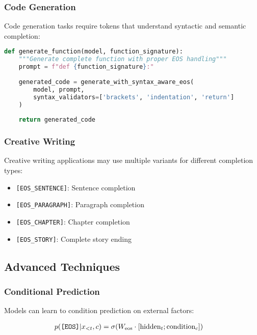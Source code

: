 \subsubsection{Code Generation}

Code generation tasks require \eos{} tokens that understand syntactic and semantic completion:

\begin{lstlisting}[language=Python, caption=Code generation with syntactic \eos{}]
def generate_function(model, function_signature):
    """Generate complete function with proper EOS handling"""
    prompt = f"def {function_signature}:"
    
    generated_code = generate_with_syntax_aware_eos(
        model, prompt, 
        syntax_validators=['brackets', 'indentation', 'return']
    )
    
    return generated_code
\end{lstlisting}

\subsubsection{Creative Writing}

Creative writing applications may use multiple \eos{} variants for different completion types:

\begin{itemize}
\item \texttt{[EOS\_SENTENCE]}: Sentence completion
\item \texttt{[EOS\_PARAGRAPH]}: Paragraph completion  
\item \texttt{[EOS\_CHAPTER]}: Chapter completion
\item \texttt{[EOS\_STORY]}: Complete story ending
\end{itemize}

\subsection{Advanced \eos{} Techniques}

\subsubsection{Conditional \eos{} Prediction}

Models can learn to condition \eos{} prediction on external factors:

\begin{align}
p(\text{\texttt{[EOS]}{}} | x_{<t}, c) &= \sigma(W_{\text{eos}} \cdot [\text{hidden}_t; \text{condition}_c])
\end{align}

